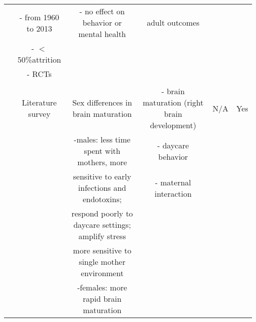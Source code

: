 \begin{tabular}{cccccc}
	&	- from 1960 to 2013	&	- no effect on behavior or mental health	&	adult outcomes	&		&		\\ 
	&	- $<$ 50\%attrition	&		&		&		&		\\ 
	&	- RCTs	&		&		&		&		\\ \\ \midrule
\citet{Schore_2017_IMHJ}	&	Literature survey	&	Sex differences in brain maturation 	&	- brain maturation (right brain development)	&	N/A	&	Yes	\\ 
	&		&	-males: less time spent with mothers, more	&	- daycare behavior	&		&		\\ 
	&		&	sensitive to early infections and endotoxins; 	&	- maternal interaction 	&		&		\\ 
	&		&	respond poorly to daycare settings; amplify stress	&		&		&		\\ 
	&		&	more sensitive to single mother environment	&		&		&		\\ 
	&		&	-females: more rapid brain maturation	&		&		&		\\ \bottomrule
\end{tabular}											